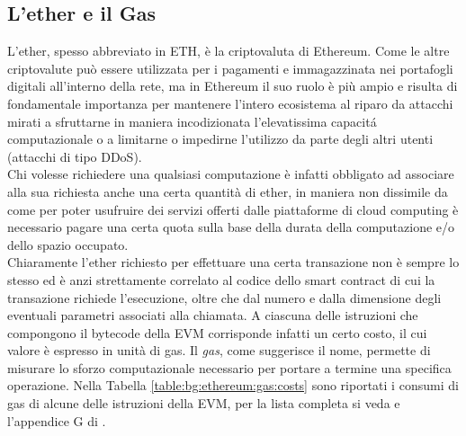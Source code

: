 \documentclass[12pt,a4paper,openright,oneside]{report}
\theoremstyle{definition}
\begin{document}
\subsection{L'ether e il Gas}\label{bg:ethereum:gas}
L'ether, spesso abbreviato in ETH, \`{e} la criptovaluta di Ethereum. Come le altre criptovalute pu\`{o} essere utilizzata per i pagamenti e immagazzinata nei portafogli digitali all'interno della rete, ma in Ethereum il suo ruolo \`{e} pi\`{u} ampio e risulta di fondamentale importanza per mantenere l'intero ecosistema al riparo da attacchi mirati a sfruttarne in maniera incodizionata l'elevatissima capacit\'{a} computazionale o a limitarne o impedirne l'utilizzo da parte degli altri utenti (attacchi di tipo DDoS).\\
Chi volesse richiedere una qualsiasi computazione \`{e} infatti obbligato ad associare alla sua richiesta anche una certa quantit\`{a} di ether, in maniera non dissimile da come per poter usufruire dei servizi offerti dalle piattaforme di cloud computing \`{e} necessario pagare una certa quota sulla base della durata della computazione e/o dello spazio occupato.\\
Chiaramente l'ether richiesto per effettuare una certa transazione non \`{e} sempre lo stesso ed \`{e} anzi strettamente correlato al codice dello smart contract di cui la transazione richiede l'esecuzione, oltre che dal numero e dalla dimensione degli eventuali parametri associati alla chiamata. A ciascuna delle istruzioni che compongono il bytecode della EVM corrisponde infatti un certo costo, il cui valore \`{e} espresso in unit\`{a} di gas. Il \textit{gas}, come suggerisce il nome, permette di misurare lo sforzo computazionale necessario per portare a termine una specifica operazione. Nella Tabella \ref{table:bg:ethereum:gas:costs} sono riportati i consumi di gas di alcune delle istruzioni della EVM, per la lista completa si veda \cite{gascosts_excel} e l'appendice G di \cite{yellow_paper}.
\end{document}
